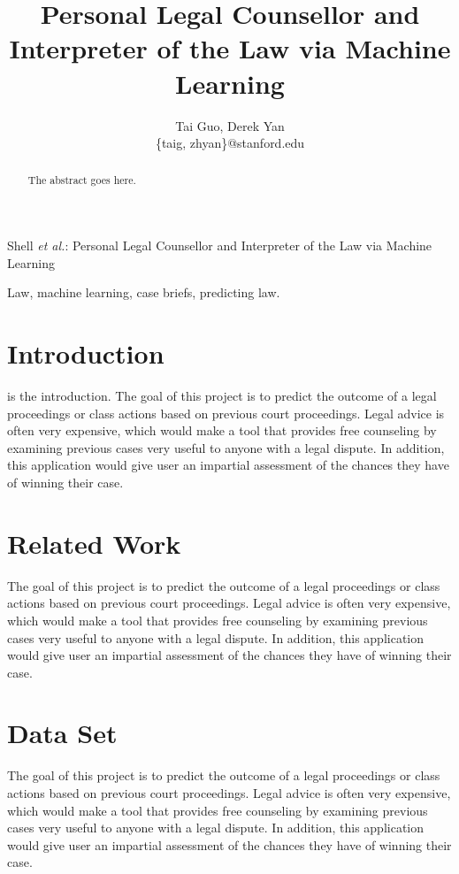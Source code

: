 \documentclass[journal]{IEEEtran}
\begin{document}
\title{Personal Legal Counsellor and Interpreter of the Law via Machine Learning}
\author{Tai Guo, Derek Yan\\
\{taig, zhyan\}@stanford.edu}
{Shell \MakeLowercase{\textit{et al.}}: Personal Legal Counsellor and Interpreter of the Law via Machine Learning}
\maketitle

\begin{abstract}
The abstract goes here.
\end{abstract}

\begin{keywords}
Law, machine learning, case briefs, predicting law.
\end{keywords}

\section{Introduction}
 is the introduction.
The goal of this project is to predict the outcome of a legal proceedings or class actions based on previous court proceedings. Legal advice is often very expensive, which would make a tool that provides free counseling by examining previous cases very useful to anyone with a legal dispute. In addition, this application would give user an impartial assessment of the chances they have of winning their case.

\section{Related Work}
The goal of this project is to predict the outcome of a legal proceedings or class actions based on previous court proceedings. Legal advice is often very expensive, which would make a tool that provides free counseling by examining previous cases very useful to anyone with a legal dispute. In addition, this application would give user an impartial assessment of the chances they have of winning their case.

\section{Data Set}
The goal of this project is to predict the outcome of a legal proceedings or class actions based on previous court proceedings. Legal advice is often very expensive, which would make a tool that provides free counseling by examining previous cases very useful to anyone with a legal dispute. In addition, this application would give user an impartial assessment of the chances they have of winning their case.
\end{document}
